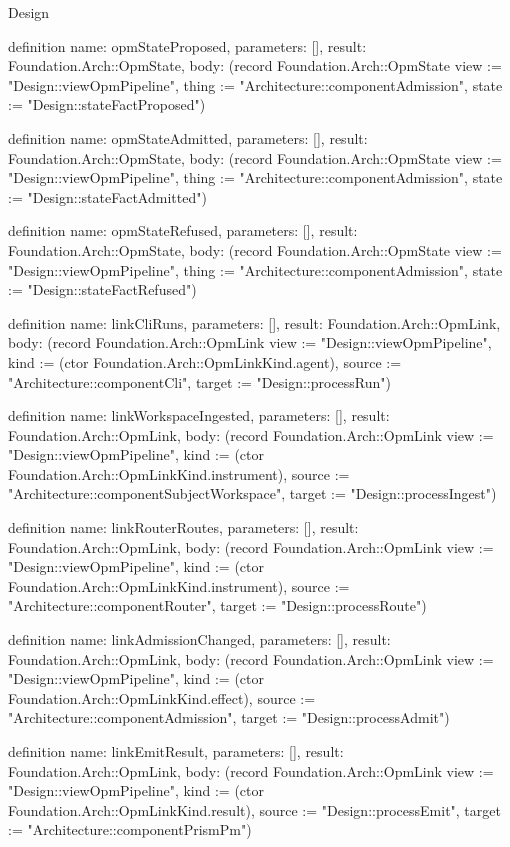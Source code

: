 \begin{lexlean}{Design}
\begin{semanticmodule}
definition{
  name: opmStateProposed,
  parameters: [],
  result: Foundation.Arch::OpmState,
  body: (record Foundation.Arch::OpmState {view := "Design::viewOpmPipeline", thing := "Architecture::componentAdmission", state := "Design::stateFactProposed"})
}

definition{
  name: opmStateAdmitted,
  parameters: [],
  result: Foundation.Arch::OpmState,
  body: (record Foundation.Arch::OpmState {view := "Design::viewOpmPipeline", thing := "Architecture::componentAdmission", state := "Design::stateFactAdmitted"})
}

definition{
  name: opmStateRefused,
  parameters: [],
  result: Foundation.Arch::OpmState,
  body: (record Foundation.Arch::OpmState {view := "Design::viewOpmPipeline", thing := "Architecture::componentAdmission", state := "Design::stateFactRefused"})
}

definition{
  name: linkCliRuns,
  parameters: [],
  result: Foundation.Arch::OpmLink,
  body: (record Foundation.Arch::OpmLink {view := "Design::viewOpmPipeline", kind := (ctor Foundation.Arch::OpmLinkKind.agent), source := "Architecture::componentCli", target := "Design::processRun"})
}

definition{
  name: linkWorkspaceIngested,
  parameters: [],
  result: Foundation.Arch::OpmLink,
  body: (record Foundation.Arch::OpmLink {view := "Design::viewOpmPipeline", kind := (ctor Foundation.Arch::OpmLinkKind.instrument), source := "Architecture::componentSubjectWorkspace", target := "Design::processIngest"})
}

definition{
  name: linkRouterRoutes,
  parameters: [],
  result: Foundation.Arch::OpmLink,
  body: (record Foundation.Arch::OpmLink {view := "Design::viewOpmPipeline", kind := (ctor Foundation.Arch::OpmLinkKind.instrument), source := "Architecture::componentRouter", target := "Design::processRoute"})
}

definition{
  name: linkAdmissionChanged,
  parameters: [],
  result: Foundation.Arch::OpmLink,
  body: (record Foundation.Arch::OpmLink {view := "Design::viewOpmPipeline", kind := (ctor Foundation.Arch::OpmLinkKind.effect), source := "Architecture::componentAdmission", target := "Design::processAdmit"})
}

definition{
  name: linkEmitResult,
  parameters: [],
  result: Foundation.Arch::OpmLink,
  body: (record Foundation.Arch::OpmLink {view := "Design::viewOpmPipeline", kind := (ctor Foundation.Arch::OpmLinkKind.result), source := "Design::processEmit", target := "Architecture::componentPrismPm"})
}


\end{semanticmodule}
\end{lexlean}
